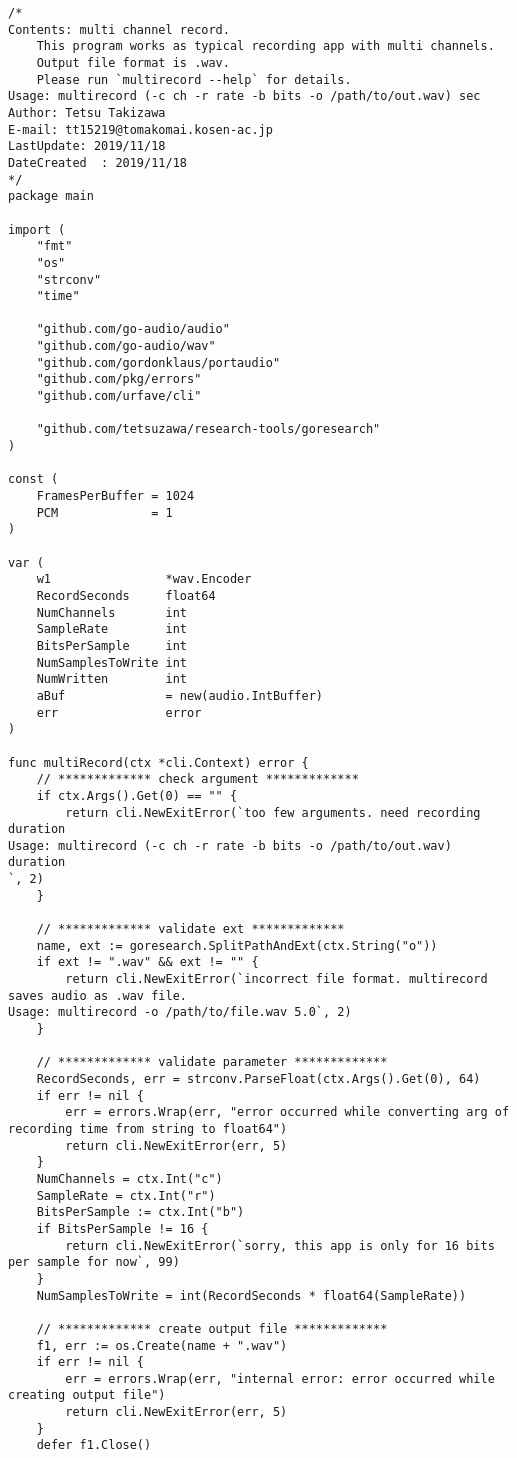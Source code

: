 \begin{lstlisting}[caption=cmd/multirecord/multirecord.go,label=multirecord/multirecord]
/*
Contents: multi channel record.
	This program works as typical recording app with multi channels.
	Output file format is .wav.
	Please run `multirecord --help` for details.
Usage: multirecord (-c ch -r rate -b bits -o /path/to/out.wav) sec
Author: Tetsu Takizawa
E-mail: tt15219@tomakomai.kosen-ac.jp
LastUpdate: 2019/11/18
DateCreated  : 2019/11/18
*/
package main

import (
	"fmt"
	"os"
	"strconv"
	"time"

	"github.com/go-audio/audio"
	"github.com/go-audio/wav"
	"github.com/gordonklaus/portaudio"
	"github.com/pkg/errors"
	"github.com/urfave/cli"

	"github.com/tetsuzawa/research-tools/goresearch"
)

const (
	FramesPerBuffer = 1024
	PCM             = 1
)

var (
	w1                *wav.Encoder
	RecordSeconds     float64
	NumChannels       int
	SampleRate        int
	BitsPerSample     int
	NumSamplesToWrite int
	NumWritten        int
	aBuf              = new(audio.IntBuffer)
	err               error
)

func multiRecord(ctx *cli.Context) error {
	// ************* check argument *************
	if ctx.Args().Get(0) == "" {
		return cli.NewExitError(`too few arguments. need recording duration
Usage: multirecord (-c ch -r rate -b bits -o /path/to/out.wav) duration
`, 2)
	}

	// ************* validate ext *************
	name, ext := goresearch.SplitPathAndExt(ctx.String("o"))
	if ext != ".wav" && ext != "" {
		return cli.NewExitError(`incorrect file format. multirecord saves audio as .wav file.
Usage: multirecord -o /path/to/file.wav 5.0`, 2)
	}

	// ************* validate parameter *************
	RecordSeconds, err = strconv.ParseFloat(ctx.Args().Get(0), 64)
	if err != nil {
		err = errors.Wrap(err, "error occurred while converting arg of recording time from string to float64")
		return cli.NewExitError(err, 5)
	}
	NumChannels = ctx.Int("c")
	SampleRate = ctx.Int("r")
	BitsPerSample := ctx.Int("b")
	if BitsPerSample != 16 {
		return cli.NewExitError(`sorry, this app is only for 16 bits per sample for now`, 99)
	}
	NumSamplesToWrite = int(RecordSeconds * float64(SampleRate))

	// ************* create output file *************
	f1, err := os.Create(name + ".wav")
	if err != nil {
		err = errors.Wrap(err, "internal error: error occurred while creating output file")
		return cli.NewExitError(err, 5)
	}
	defer f1.Close()


\end{lstlisting}
